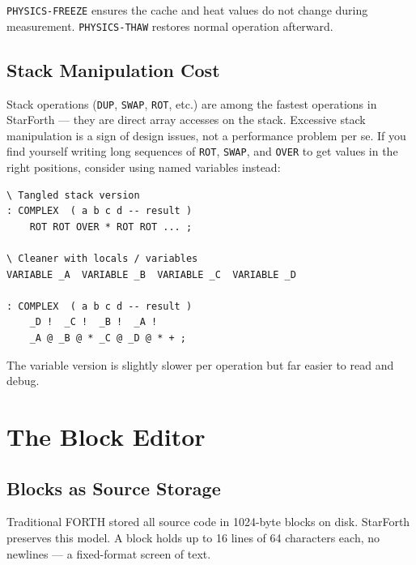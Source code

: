 \texttt{PHYSICS-FREEZE} ensures the cache and heat values do not change during
measurement. \texttt{PHYSICS-THAW} restores normal operation afterward.

\section{Stack Manipulation Cost}
\label{sec:stack-cost}

Stack operations (\texttt{DUP}, \texttt{SWAP}, \texttt{ROT}, etc.) are among
the fastest operations in StarForth --- they are direct array accesses on
the stack. Excessive stack manipulation is a sign of design issues, not a
performance problem per se. If you find yourself writing long sequences of
\texttt{ROT}, \texttt{SWAP}, and \texttt{OVER} to get values in the right
positions, consider using named variables instead:

\begin{lstlisting}[language=Forth]
\ Tangled stack version
: COMPLEX  ( a b c d -- result )
    ROT ROT OVER * ROT ROT ... ;

\ Cleaner with locals / variables
VARIABLE _A  VARIABLE _B  VARIABLE _C  VARIABLE _D

: COMPLEX  ( a b c d -- result )
    _D !  _C !  _B !  _A !
    _A @ _B @ * _C @ _D @ * + ;
\end{lstlisting}

The variable version is slightly slower per operation but far easier to read
and debug.

\chapter{The Block Editor}
\label{chap:block-editor}

\section{Blocks as Source Storage}
\label{sec:blocks-as-source}

Traditional FORTH stored all source code in 1024-byte blocks on disk. StarForth
preserves this model. A block holds up to 16 lines of 64 characters each, no
newlines --- a fixed-format screen of text.

